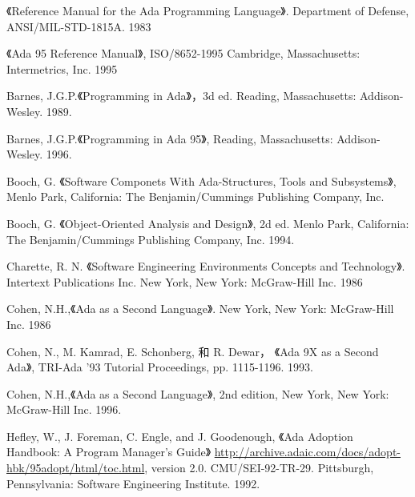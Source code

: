 %
%
%

\cleardoublepage
{}
\begin{thebibliography}{widest-label}\label{bib}

 《Reference Manual for the Ada Programming
Language》. Department of Defense, ANSI/MIL-STD-1815A. 1983

 《Ada 95 Reference Manual》,
ISO/8652-1995 Cambridge, Massachusetts: Intermetrics, Inc. 1995

 Barnes, J.G.P.《Programming in Ada》，3d ed.
Reading, Massachusetts: Addison-Wesley. 1989.

 Barnes, J.G.P.《Programming in Ada 95》,
Reading, Massachusetts: Addison-Wesley. 1996.

 Booch, G. 《Software Componets With Ada-Structures, Tools and Subsystems》,
Menlo Park, California: The Benjamin/Cummings Publishing Company, Inc.

 Booch, G. 《Object-Oriented Analysis and
Design》, 2d ed. Menlo Park, California: The Benjamin/Cummings Publishing
Company, Inc. 1994.

 Charette, R. N. 《Software Engineering Environments Concepts and Technology》. Intertext Publications Inc. New York, New York: McGraw-Hill Inc. 1986

 Cohen, N.H.,《Ada as a Second Language》.
 New York, New York: McGraw-Hill Inc. 1986

 Cohen, N., M. Kamrad, E. Schonberg,
和 R. Dewar，  《Ada 9X as a Second Ada》, TRI-Ada '93 Tutorial Proceedings,
pp. 1115-1196. 1993.

 Cohen, N.H.,《Ada as a Second Language》,
2nd edition, New York, New York: McGraw-Hill Inc. 1996.

 Hefley, W., J. Foreman, C. Engle, and
J. Goodenough, 《Ada Adoption Handbook: A Program Manager's Guide》
\url{http://archive.adaic.com/docs/adopt-hbk/95adopt/html/toc.html},
version 2.0. CMU/SEI-92-TR-29. Pittsburgh, Pennsylvania:
Software Engineering Institute. 1992.


\end{thebibliography}
